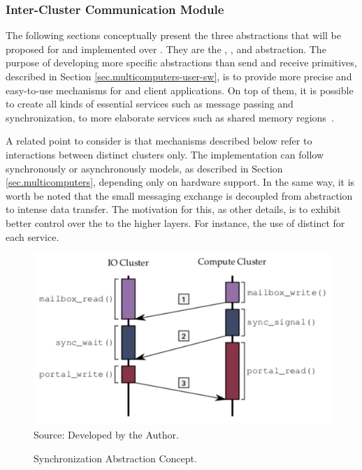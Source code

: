 		\subsubsection{Inter-Cluster Communication Module}
		\label{sec.inter-cluster-communication}

			The following sections conceptually present the three abstractions
			that will be proposed for \hal and implemented over \mppa.
			They are the \sync, \mailbox, and \portal abstraction.
			The purpose of developing more specific abstractions than
			send and receive primitives, described in Section \ref{sec.multicomputers-user-sw},
			is to provide more precise and easy-to-use mechanisms for
			\os and client applications.
			On top of them, it is possible to create all kinds of essential
			services such as message passing and synchronization,
			to more elaborate services such as shared memory regions~\cite{penna:rmen}.

			A related point to consider is that mechanisms described below refer
			to interactions between distinct clusters only.
			The implementation can follow synchronously or asynchronously models,
			as described in Section \ref{sec.multicomputers}, depending only on hardware support.
			In the same way, it is worth be noted that the small messaging exchange
			is decoupled from abstraction to intense data transfer.
			The motivation for this, as other details, is to exhibit better control
			over the \qos to the higher layers.
			For instance, the use of distinct \nocs for each service.

			\label{sec.sync-abs}

				\begin{figure}[t]
					\centering
					\caption{Synchronization Abstraction Concept.}
					\includegraphics[width=.7\textwidth]{images/conceptual-sync.png}
					Source: Developed by the Author.
					\label{fig.conpt_sync}
				\end{figure}

